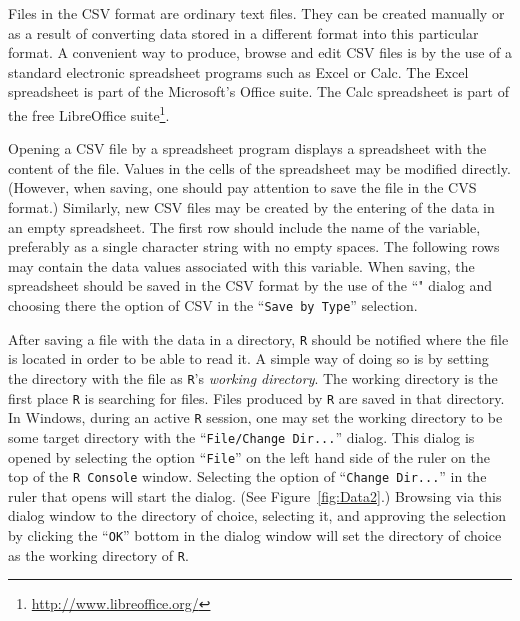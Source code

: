 \documentclass[]{krantz}
\renewcommand{\href}[2]{#2\footnote{\url{#1}}}
\theoremstyle{definition}
\theoremstyle{definition}
\theoremstyle{definition}
\theoremstyle{remark}
\begin{document}
Files in the CSV format are ordinary text files. They can be created
manually or as a result of converting data stored in a different format
into this particular format. A convenient way to produce, browse and
edit CSV files is by the use of a standard electronic spreadsheet
programs such as Excel or Calc. The Excel spreadsheet is part of the
Microsoft's Office suite. The Calc spreadsheet is part of the free \href{http://www.libreoffice.org/}{LibreOffice
suite}.

Opening a CSV file by a spreadsheet program displays a spreadsheet with
the content of the file. Values in the cells of the spreadsheet may be
modified directly. (However, when saving, one should pay attention to
save the file in the CVS format.) Similarly, new CSV files may be
created by the entering of the data in an empty spreadsheet. The first
row should include the name of the variable, preferably as a single
character string with no empty spaces. The following rows may contain
the data values associated with this variable. When saving, the
spreadsheet should be saved in the CSV format by the use of the ``"
dialog and choosing there the option of CSV in the ``\texttt{Save\ by\ Type}''
selection.

After saving a file with the data in a directory, \texttt{R} should be notified
where the file is located in order to be able to read it. A simple way
of doing so is by setting the directory with the file as \texttt{R}'s \emph{working
directory}. The working directory is the first place \texttt{R} is searching
for files. Files produced by \texttt{R} are saved in that directory. In
Windows, during an active \texttt{R} session, one may set the working directory
to be some target directory with the ``\texttt{File/Change\ Dir...}'' dialog. This
dialog is opened by selecting the option ``\texttt{File}'' on the left hand side
of the ruler on the top of the \texttt{R\ Console} window. Selecting the option
of ``\texttt{Change\ Dir...}'' in the ruler that opens will start the dialog. (See
Figure~\ref{fig:Data2}.) Browsing via this dialog window to the
directory of choice, selecting it, and approving the selection by
clicking the ``\texttt{OK}'' bottom in the dialog window will set the directory
of choice as the working directory of \texttt{R}.
\end{document}

